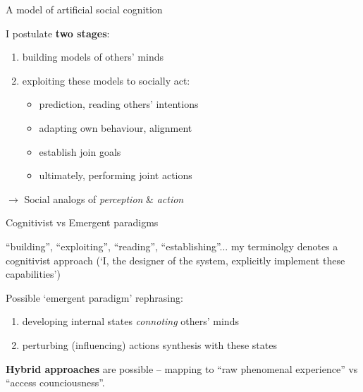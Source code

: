 \documentclass[xcolor=table]{beamer}
\begin{document}
\begin{frame}{A model of artificial social cognition}

    I postulate {\bf two stages}:

    \begin{enumerate}
        \item building models of others' minds
        \item exploiting these models to socially act:
            \begin{itemize}
                \item prediction, reading others' intentions
                \item adapting own behaviour, alignment
                \item establish join goals
                \item ultimately, performing joint actions
            \end{itemize}
    \end{enumerate}

    \vspace{2em}
    $\rightarrow$ Social analogs of \emph{perception} \& \emph{action}

\end{frame}


{
\begin{frame}{Cognitivist vs Emergent paradigms}

    ``building'', ``exploiting'', ``reading'', ``establishing''... my terminolgy
    denotes a cognitivist approach (`I, the designer of the system, explicitly implement
    these capabilities')

    \pause
    
    Possible `emergent paradigm' rephrasing:

    \begin{enumerate}
        \item developing internal states \emph{connoting} others' minds
        \item perturbing (influencing) actions synthesis with these states
    \end{enumerate}

    \pause

    {\bf Hybrid approaches} are possible -- mapping to ``raw phenomenal experience'' vs
    ``access counciousness''.
\end{frame}
}
\end{document}
